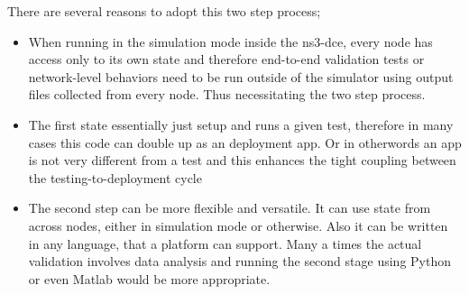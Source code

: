 There are several reasons to adopt this two step process;
\begin{itemize}
	\item When running in the simulation mode inside the ns3-dce, every node has access only to its own state and therefore end-to-end validation tests or network-level behaviors need to be run outside of the simulator using output files collected from every node. Thus necessitating the two step process.
	\item The first state essentially just setup and runs a given test, therefore in many cases this code can double up as an deployment app. Or in otherwords an app is not very different from a test and this enhances the tight coupling between the testing-to-deployment cycle
	\item The second step can be more flexible and versatile. It can use state from across nodes, either in simulation mode or otherwise. Also it can be written in any language, that a platform can support. Many a times the actual validation involves data analysis and running the second stage using Python or even Matlab would be more appropriate.
\end{itemize}


